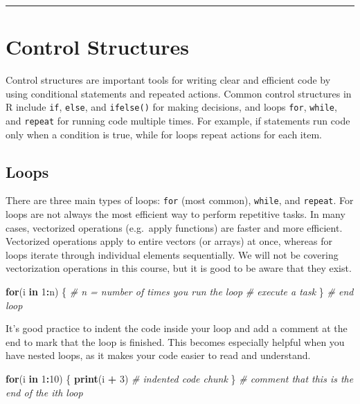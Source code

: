 \documentclass[
]{book}
\newenvironment{Shaded}{\begin{snugshade}}{\end{snugshade}}
\newcommand{\CommentTok}[1]{\textcolor[rgb]{0.56,0.35,0.01}{\textit{#1}}}
\newcommand{\ControlFlowTok}[1]{\textcolor[rgb]{0.13,0.29,0.53}{\textbf{#1}}}
\newcommand{\DecValTok}[1]{\textcolor[rgb]{0.00,0.00,0.81}{#1}}
\newcommand{\FunctionTok}[1]{\textcolor[rgb]{0.13,0.29,0.53}{\textbf{#1}}}
\newcommand{\NormalTok}[1]{#1}
\newcommand{\SpecialCharTok}[1]{\textcolor[rgb]{0.81,0.36,0.00}{\textbf{#1}}}
\begin{document}
\begin{center}\rule{0.5\linewidth}{0.5pt}\end{center}

\chapter{Control Structures}\label{control}

Control structures are important tools for writing clear and efficient code by using conditional statements and repeated actions. Common control structures in R include \texttt{if}, \texttt{else}, and \texttt{ifelse()} for making decisions, and loops \texttt{for}, \texttt{while}, and \texttt{repeat} for running code multiple times. For example, if statements run code only when a condition is true, while for loops repeat actions for each item.

\section{Loops}\label{for-loops}

There are three main types of loops: \texttt{for} (most common), \texttt{while}, and \texttt{repeat}. For loops are not always the most efficient way to perform repetitive tasks. In many cases, vectorized operations (e.g.~apply functions) are faster and more efficient. Vectorized operations apply to entire vectors (or arrays) at once, whereas for loops iterate through individual elements sequentially. We will not be covering vectorization operations in this course, but it is good to be aware that they exist.

\begin{Shaded}
\begin{Highlighting}[]
\ControlFlowTok{for}\NormalTok{(i }\ControlFlowTok{in} \DecValTok{1}\SpecialCharTok{:}\NormalTok{n) \{ }\CommentTok{\# n = number of times you run the loop}
  \CommentTok{\# execute a task}
\NormalTok{\} }\CommentTok{\# end loop}
\end{Highlighting}
\end{Shaded}

It's good practice to indent the code inside your loop and add a comment at the end to mark that the loop is finished. This becomes especially helpful when you have nested loops, as it makes your code easier to read and understand.

\begin{Shaded}
\begin{Highlighting}[]
\ControlFlowTok{for}\NormalTok{(i }\ControlFlowTok{in} \DecValTok{1}\SpecialCharTok{:}\DecValTok{10}\NormalTok{) \{}
  \FunctionTok{print}\NormalTok{(i }\SpecialCharTok{+} \DecValTok{3}\NormalTok{) }\CommentTok{\# indented code chunk}
\NormalTok{\} }\CommentTok{\# comment that this is the end of the ith loop}
\end{Highlighting}
\end{Shaded}
\end{document}
